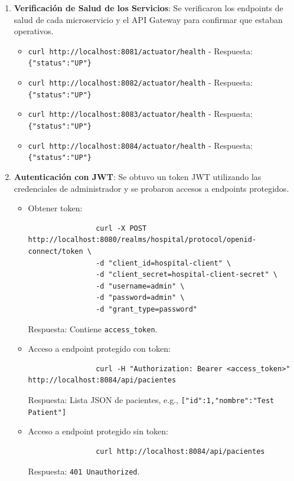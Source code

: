 \documentclass{article}
\begin{document}
\begin{enumerate}
    \item \textbf{Verificación de Salud de los Servicios}: Se verificaron los endpoints de salud de cada microservicio y el API Gateway para confirmar que estaban operativos.
        \begin{itemize}
            \item \texttt{curl http://localhost:8081/actuator/health} - Respuesta: \texttt{\{"status":"UP"\}}
            \item \texttt{curl http://localhost:8082/actuator/health} - Respuesta: \texttt{\{"status":"UP"\}}
            \item \texttt{curl http://localhost:8083/actuator/health} - Respuesta: \texttt{\{"status":"UP"\}}
            \item \texttt{curl http://localhost:8084/actuator/health} - Respuesta: \texttt{\{"status":"UP"\}}
        \end{itemize}

    \item \textbf{Autenticación con JWT}: Se obtuvo un token JWT utilizando las credenciales de administrador y se probaron accesos a endpoints protegidos.
        \begin{itemize}
            \item Obtener token:
                \begin{verbatim}
                curl -X POST http://localhost:8080/realms/hospital/protocol/openid-connect/token \
                -d "client_id=hospital-client" \
                -d "client_secret=hospital-client-secret" \
                -d "username=admin" \
                -d "password=admin" \
                -d "grant_type=password"
                \end{verbatim}
                Respuesta: Contiene \texttt{access_token}.

            \item Acceso a endpoint protegido con token:
                \begin{verbatim}
                curl -H "Authorization: Bearer <access_token>" http://localhost:8084/api/pacientes
                \end{verbatim}
                Respuesta: Lista JSON de pacientes, e.g., \texttt{[{"id":1,"nombre":"Test Patient"}]}

            \item Acceso a endpoint protegido sin token:
                \begin{verbatim}
                curl http://localhost:8084/api/pacientes
                \end{verbatim}
                Respuesta: \texttt{401 Unauthorized}.
        \end{itemize}


\end{enumerate}
\end{document}
